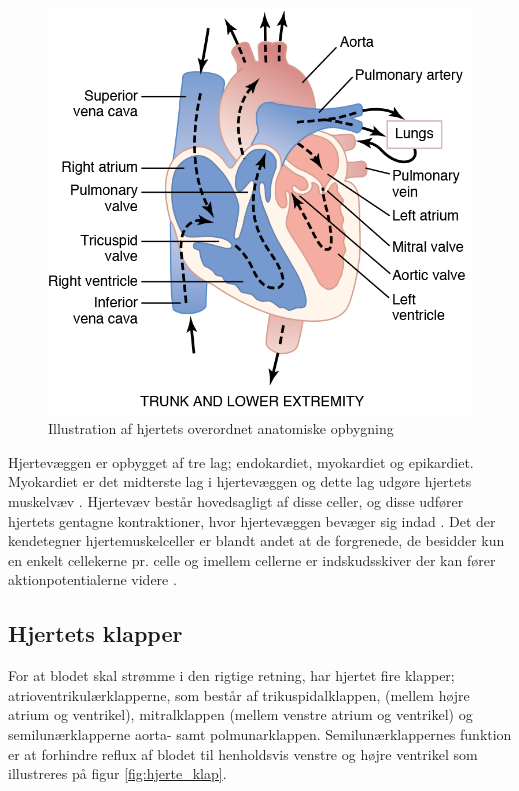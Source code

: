 \begin{figure}[H] %
\begin{center}
\includegraphics[width=1\textwidth]{figures/hjertet_overordnet}
\end{center}
\caption{Illustration af hjertets overordnet anatomiske opbygning \cite{Guyton2006}}
\label{fig:hjerte_overordnet}
\end{figure}


\noindent Hjertevæggen er opbygget af tre lag; endokardiet, myokardiet og epikardiet. Myokardiet er det midterste lag i hjertevæggen og dette lag udgøre hjertets muskelvæv \cite{gronanatomi}. Hjertevæv består hovedsagligt af disse celler, og disse udfører hjertets gentagne kontraktioner, hvor hjertevæggen bevæger sig indad \cite{cindy}. 
Det der kendetegner hjertemuskelceller er blandt andet at de forgrenede, de besidder kun en enkelt cellekerne pr. celle og imellem cellerne er indskudsskiver der kan fører aktionpotentialerne videre \cite{martini}.

\subsection{Hjertets klapper}
For at blodet skal strømme i den rigtige retning, har hjertet fire klapper; atrioventrikulærklapperne, som består af trikuspidalklappen, (mellem højre atrium og ventrikel), mitralklappen (mellem venstre atrium og ventrikel) og semilunærklapperne aorta- samt polmunarklappen. Semilunærklappernes funktion er at forhindre reflux af blodet til henholdsvis venstre og højre ventrikel som illustreres på figur \ref{fig:hjerte_klap}.  \cite{gronanatomi}  

